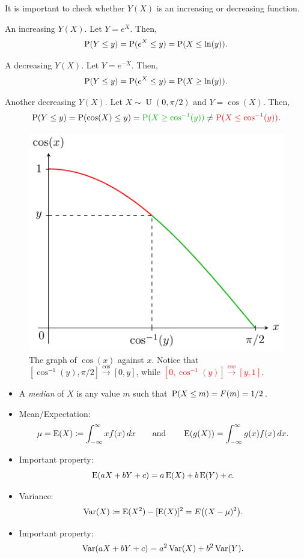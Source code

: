 \begin{note}
  It is important to check whether \(Y(X)\) is an increasing or decreasing function.
\end{note}
\begin{example}{An increasing \(Y(X)\).}{}
  Let \(Y=e^X\). Then,
  \[\operatorname{P}(Y\leq y)=\operatorname{P}(e^X\leq y)=\operatorname{P}(X\leq\ln(y)).\]
\end{example}
\begin{example}{A decreasing \(Y(X)\).}{}
  Let \(Y=e^{-X}\). Then,
  \[\operatorname{P}(Y\leq y)=\operatorname{P}(e^X\leq y)=\operatorname{P}(X\geq\ln(y)).\]
\end{example}
\begin{example}{Another decreasing \(Y(X)\).}{}
  Let \(X\sim\operatorname{U}(0,\pi/2)\) and \(Y=\cos(X)\). Then, 
  \[\Prob(Y\leq y)=\Prob(\cos(X)\leq y)=\textcolor{green!70!black}{\Prob(X\geq\cos^{-1}(y))}\neq \textcolor{red}{\Prob(X\leq\cos^{-1}(y))}.\]
  \begin{figure}[H]
    \centering
    \includegraphics{Diagrams/CRV-cosine/diagram.pdf}
    \caption{The graph of \(\cos(x)\) against \(x\). Notice that \textcolor{green!70!black}{\([\cos^{-1}(y),\pi/2]\stackrel{\cos}{\to}[0,y]\)}, while \textcolor{red}{\([0,\cos^{-1}(y)]\stackrel{\cos}{\to}[y,1]\)}.}
    \label{fig:CRV-cosine}
  \end{figure}
\end{example}
\begin{stbox}{}
  \begin{itemize}
    \item A \emph{median} of \(X\) is any value \(m\) such that \(\operatorname{P}(X\leq m)=F(m)=1/2\).
    \item Mean/Expectation: 
    \[\mu=\operatorname{E}(X)\coloneq \int_{-\infty}^{\infty}xf(x)\,dx \qquad\text{and}\qquad \operatorname{E}(g(X))=\int_{-\infty}^{\infty}g(x)f(x)\,dx.\]
    \item Important property: 
    \[\operatorname{E}(aX+bY+c)=a\operatorname{E}(X)+b\operatorname{E}(Y)+c.\]
    \item Variance: 
    \[\operatorname{Var}(X)\coloneq \operatorname{E}(X^2)-[\operatorname{E}(X)]^2=E{\left((X-\mu)^2\right)}.\]
    \item Important property:
    \[\operatorname{Var}(aX+bY+c)=a^2\operatorname{Var}(X)+b^2\operatorname{Var}(Y).\]
  \end{itemize}
\end{stbox}
